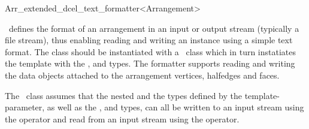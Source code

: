 
\ccRefPageBegin

\begin{ccRefClass}{Arr_extended_dcel_text_formatter<Arrangement>}

\ccDefinition

\ccRefName\ defines the format of an arrangement in an input or output stream
(typically a file stream), thus enabling reading and writing an 
instance using a simple text format. The  class should be
instantiated with a \dcel\ class which in turn instatiates the
 template with the ,  and
 types.
The formatter supports reading and writing the data objects attached to the
arrangement vertices, halfedges and faces.

The \ccRefName\ class assumes that the nested  and the  types
defined by the  template-parameter, as well as the ,
 and  types, can all be written to an input stream using
the \ccc{<<} operator and read from an input stream using the \ccc{>>} operator.


\ccIsModel
     \\

\ccSeeAlso
     \\
     \\

\end{ccRefClass}

\ccRefPageEnd
